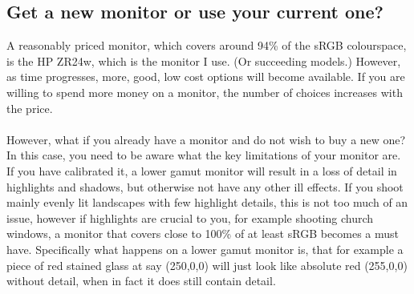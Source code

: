 \subsection{Get a new monitor or use your current one?}

A reasonably priced monitor, which covers around 94\% of the sRGB \gls{colourspace}, is the HP ZR24w, which is the monitor I use. (Or succeeding models.) However, as time progresses, more, good, low cost options will become available. If you are willing to spend more money on a monitor, the number of choices increases with the price.
\\
\\
However, what if you already have a monitor and do not wish to buy a new one?
\\
In this case, you need to be aware what the key limitations of your monitor are. If you have calibrated it, a lower gamut monitor will result in a loss of detail in highlights and shadows, but otherwise not have any other ill effects. If you shoot mainly evenly lit landscapes with few highlight details, this is not too much of an issue, however if highlights are crucial to you, for example shooting church windows, a monitor that covers close to 100\% of at least sRGB becomes a must have. Specifically what happens on a lower gamut monitor is, that for example a piece of red stained glass at say (250,0,0) will just look like absolute red (255,0,0) without detail, when in fact it does still contain detail.
